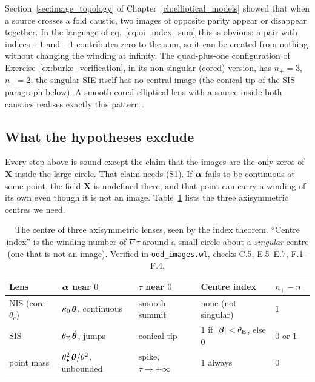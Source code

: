 \begin{bridge}
Section~\ref{sec:image_topology} of Chapter~\ref{ch:elliptical_models}
showed that when a source crosses a fold caustic, two images of opposite
parity appear or disappear together.  In the language of
eq.~\eqref{eq:oi_index_sum} this is obvious: a pair with indices $+1$
and $-1$ contributes zero to the sum, so it can be created from nothing
without changing the winding at infinity.  The quad-plus-one
configuration of Exercise~\ref{ex:burke_verification}, in its
non-singular (cored) version, has $n_+=3$, $n_-=2$; the singular SIE
itself has no central image (the conical tip of the SIS paragraph
below).  A smooth cored elliptical lens with a source inside
both caustics realises exactly this pattern .
\end{bridge}

\subsection{What the hypotheses exclude}
\label{sec:oi_hypotheses}

Every step above is sound except the claim that the images
are the only zeros of $\mathbf X$ inside the large circle.  That claim
needs (S1).  If $\boldsymbol{\alpha}$ fails to be continuous at some point,
the field $\mathbf X$ is undefined there, and that point can carry a
winding of its own even though it is not an image.
Table~\ref{tab:oi_centres} lists the three axisymmetric centres we need.

\begin{table}[ht]
\centering
\caption{The centre of three axisymmetric lenses, seen by the index
theorem.  ``Centre index'' is the winding number of $\nabla\tau$ around
a small circle about a \emph{singular} centre (one that is not an
image).  Verified in \texttt{odd\_images.wl}, checks C.5, E.5--E.7, F.1--F.4.}
\label{tab:oi_centres}
\small
\begin{tabular}{lllll}
\toprule
Lens & $\boldsymbol{\alpha}$ near $0$ & $\tau$ near $0$ & Centre index & $n_+-n_-$ \\
\midrule
NIS (core $\theta_c$) & $\kappa_0\,\boldsymbol{\theta}$, continuous & smooth summit
    & none (not singular) & $1$ \\
SIS & $\theta_{\mathrm{E}}\,\hat{\boldsymbol{\theta}}$, jumps & conical tip
    & $1$ if $|\boldsymbol{\beta}|<\theta_{\mathrm{E}}$, else $0$ & $0$ or $1$ \\
point mass & $\theta_{\bullet}^2\,\boldsymbol{\theta}/\theta^2$, unbounded & spike, $\tau\to+\infty$
    & $1$ always & $0$ \\
\bottomrule
\end{tabular}
\end{table}

